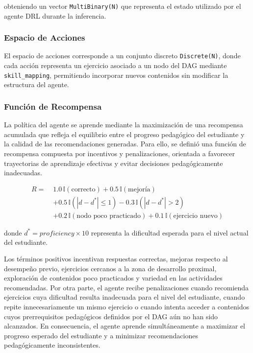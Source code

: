 \documentclass[conference]{IEEEtran}
\begin{document}
obteniendo un vector \texttt{MultiBinary(N)} que representa el estado utilizado por el agente DRL durante la inferencia.

\subsubsection{Espacio de Acciones}

El espacio de acciones corresponde a un conjunto discreto \texttt{Discrete(N)}, donde cada acción representa un ejercicio asociado a un nodo del DAG mediante \texttt{skill\_mapping}, permitiendo incorporar nuevos contenidos sin modificar la estructura del agente.

\subsubsection{Función de Recompensa}

La política del agente se aprende mediante la maximización de una recompensa acumulada que refleja el equilibrio entre el progreso pedagógico del estudiante y la calidad de las recomendaciones generadas. Para ello, se definió una función de recompensa compuesta por incentivos y penalizaciones, orientada a favorecer trayectorias de aprendizaje efectivas y evitar decisiones pedagógicamente inadecuadas.

\begin{equation}
\begin{aligned}
R =\;&
1.0\,\mathbb{I}(\text{correcto})
+0.5\,\mathbb{I}(\text{mejoría}) \\
&+0.5\,\mathbb{I}\!\left(
|d-d^{*}|\le1
\right)
-0.3\,\mathbb{I}\!\left(
|d-d^{*}|>2
\right) \\
&+0.2\,\mathbb{I}(\text{nodo poco practicado})
+0.1\,\mathbb{I}(\text{ejercicio nuevo})
\end{aligned}
\end{equation}

donde $d^{*}=proficiency\times10$ representa la dificultad esperada para el nivel actual del estudiante.

Los términos positivos incentivan respuestas correctas, mejoras respecto al desempeño previo, ejercicios cercanos a la zona de desarrollo proximal, exploración de contenidos poco practicados y variedad en las actividades recomendadas. Por otra parte, el agente recibe penalizaciones cuando recomienda ejercicios cuya dificultad resulta inadecuada para el nivel del estudiante, cuando repite innecesariamente un mismo ejercicio o cuando intenta acceder a contenidos cuyos prerrequisitos pedagógicos definidos por el DAG aún no han sido alcanzados. En consecuencia, el agente aprende simultáneamente a maximizar el progreso esperado del estudiante y a minimizar recomendaciones pedagógicamente inconsistentes.
\end{document}
